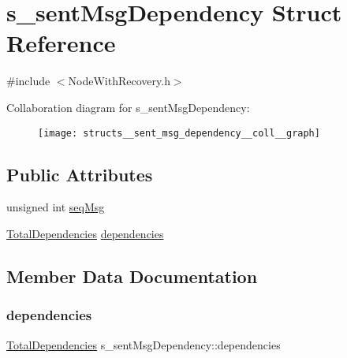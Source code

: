 \hypertarget{structs__sent_msg_dependency}{}\section{s\+\_\+sent\+Msg\+Dependency Struct Reference}
\label{structs__sent_msg_dependency}


{\ttfamily \#include $<$Node\+With\+Recovery.\+h$>$}



Collaboration diagram for s\+\_\+sent\+Msg\+Dependency\+:\nopagebreak
\begin{figure}[H]
\begin{center}
\leavevmode
\texttt{[image: structs\_\_sent\_msg\_dependency\_\_coll\_\_graph]}
\end{center}
\end{figure}
\subsection*{Public Attributes}
\begin{DoxyCompactItemize}
\item 
unsigned int \hyperlink{structs__sent_msg_dependency_afd3ba2f762d695961fed00fb401bc3e7}{seq\+Msg}
\item 
\hyperlink{class_total_dependencies}{Total\+Dependencies} \hyperlink{structs__sent_msg_dependency_ab7ece51991fbcba599580914571a32cc}{dependencies}
\end{DoxyCompactItemize}


\subsection{Member Data Documentation}
\mbox{\label{structs__sent_msg_dependency_ab7ece51991fbcba599580914571a32cc}} 
\subsubsection{\texorpdfstring{dependencies}{dependencies}}
{\footnotesize\ttfamily \hyperlink{class_total_dependencies}{Total\+Dependencies} s\+\_\+sent\+Msg\+Dependency\+::dependencies}

\mbox{\label{structs__sent_msg_dependency_afd3ba2f762d695961fed00fb401bc3e7}} 
